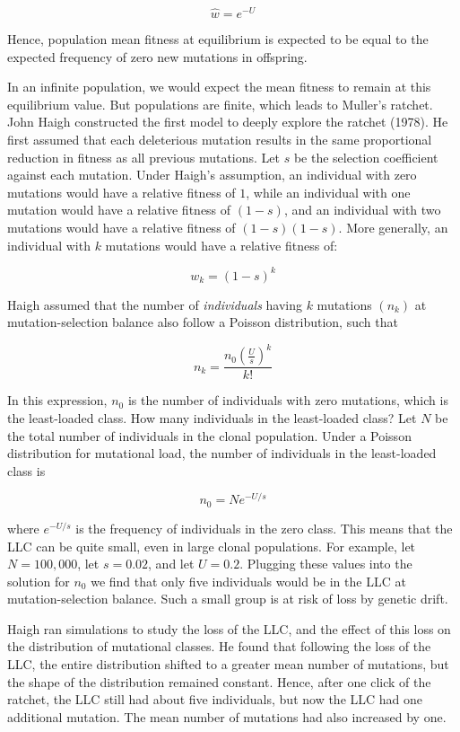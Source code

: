 \documentclass[
  letterpaper,
]{book}
\begin{document}
\[\hat{w}=e^{-U}\]

Hence, population mean fitness at equilibrium is expected to be equal to
the expected frequency of zero new mutations in offspring.

In an infinite population, we would expect the mean fitness to remain at
this equilibrium value. But populations are finite, which leads to
Muller's ratchet. John Haigh constructed the first model to deeply
explore the ratchet (1978). He first assumed that each deleterious
mutation results in the same proportional reduction in fitness as all
previous mutations. Let \(s\) be the selection coefficient against each
mutation. Under Haigh's assumption, an individual with zero mutations
would have a relative fitness of \(1\), while an individual with one
mutation would have a relative fitness of \((1-s)\), and an individual
with two mutations would have a relative fitness of \((1-s)(1-s)\). More
generally, an individual with \(k\) mutations would have a relative
fitness of:

\[w_k=(1-s)^k\]

Haigh assumed that the number of \emph{individuals} having \(k\)
mutations \((n_k)\) at mutation-selection balance also follow a Poisson
distribution, such that

\[n_k=\frac{n_0\left(\frac{U}{s}\right)^k}{k!}\]

In this expression, \(n_0\) is the number of individuals with zero
mutations, which is the least-loaded class. How many individuals in the
least-loaded class? Let \(N\) be the total number of individuals in the
clonal population. Under a Poisson distribution for mutational load, the
number of individuals in the least-loaded class is

\[n_0=Ne^{-U/s}\]

where \(e^{-U/s}\) is the frequency of individuals in the zero class.
This means that the LLC can be quite small, even in large clonal
populations. For example, let \(N = 100,000\), let \(s = 0.02\), and let
\(U = 0.2\). Plugging these values into the solution for \(n_0\) we find
that only five individuals would be in the LLC at mutation-selection
balance. Such a small group is at risk of loss by genetic drift.

Haigh ran simulations to study the loss of the LLC, and the effect of
this loss on the distribution of mutational classes. He found that
following the loss of the LLC, the entire distribution shifted to a
greater mean number of mutations, but the shape of the distribution
remained constant. Hence, after one click of the ratchet, the LLC still
had about five individuals, but now the LLC had one additional mutation.
The mean number of mutations had also increased by one.
\end{document}

